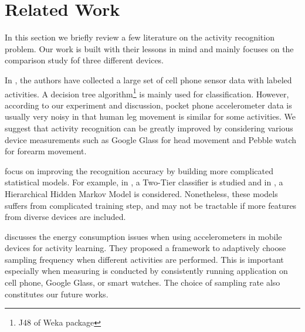 
\section{Related Work}
\label{sec:related-work}

In this section we briefly review a few literature on the activity recognition problem. Our work is built with their lessons in mind and mainly focuses on the comparison study fof three different devices. 

In \cite{kwapisz2011activity}, the authors have collected a large set of cell phone sensor data with labeled activities. A decision tree algorithm\footnote{J48 of Weka package} is mainly used for classification. However, according to our experiment and discussion, pocket phone accelerometer data is usually very noisy in that human leg movement is similar for some activities. We suggest that activity recognition can be greatly improved by considering various device measurements such as Google Glass for head movement and Pebble watch for forearm movement.

\cite{srinivasan2012accurate, lee2011activity} focus on improving the recognition accuracy by building more complicated statistical models. For example, in \cite{srinivasan2012accurate}, a Two-Tier classifier is studied and in \cite{lee2011activity}, a Hierarchical Hidden Markov Model is considered. Nonetheless, these models suffers from complicated training step, and may not be tractable if more features from diverse devices are included. 

\cite{yan2012energy} discusses the energy consumption issues when using accelerometers in mobile devices for activity learning. They proposed a framework to adaptively choose sampling frequency when different activities are performed. This is important especially when measuring is conducted by consistently running application on cell phone, Google Glass, or smart watches. The choice of sampling rate also constitutes our future works. 

 

